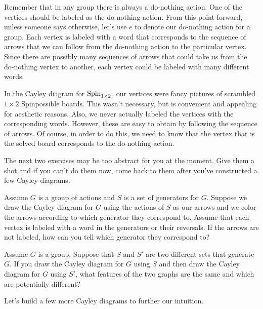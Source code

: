 Remember that in any group there is always a do-nothing action.  One of the vertices should be labeled as the do-nothing action.  From this point forward, unless someone says otherwise, let's use $e$ to denote our do-nothing action for a group.  Each vertex is labeled with a word that corresponds to the sequence of arrows that we can follow from the do-nothing action to the particular vertex.  Since there are possibly many sequences of arrows that could take us from the do-nothing vertex to another, each vertex could be labeled with many different words.

In the Cayley diagram for $\operatorname{Spin}_{1\times 2}$, our vertices were fancy pictures of scrambled $1\times 2$ Spinpossible boards.  This wasn't necessary, but is convenient and appealing for aesthetic reasons.  Also, we never actually labeled the vertices with the corresponding words.  However, these are easy to obtain by following the sequence of arrows.  Of course, in order to do this, we need to know that the vertex that is the solved board corresponds to the do-nothing action.

The next two exercises may be too abstract for you at the moment.  Give them a shot and if you can't do them now, come back to them after you've constructed a few Cayley diagrams.

\begin{exercise}\label{exer:understanding_arrows}
Assume $G$ is a group of actions and $S$ is a set of generators for $G$. Suppose we draw the Cayley diagram for $G$ using the actions of $S$ as our arrows and we color the arrows according to which generator they correspond to.  Assume that each vertex is labeled with a word in the generators or their reversals.  If the arrows are not labeled, how can you tell which generator they correspond to?
\end{exercise}

\begin{exercise}\label{exer:changing_generators_for_Cayley_diagram}
Assume $G$ is a group.  Suppose that $S$ and $S'$ are two different sets that generate $G$.  If you draw the Cayley diagram for $G$ using $S$ and then draw the Cayley diagram for $G$ using $S'$, what features of the two graphs are the same and which are potentially different?
\end{exercise}

Let's build a few more Cayley diagrams to further our intuition.

